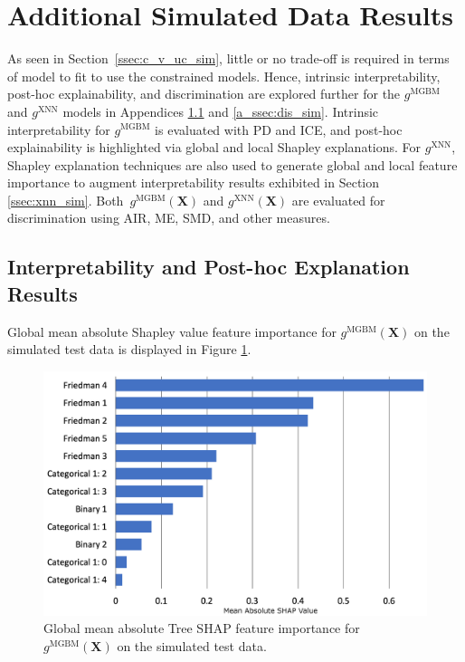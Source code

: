 \documentclass[information,article,accept,moreauthors,pdftex]{Definitions/mdpi}
\begin{document}
\section{Additional Simulated Data Results}\label{a_sec:res_sim}

As seen in Section~\ref{ssec:c_v_uc_sim}, little or no trade-off is required in terms of model to fit to use the constrained models. Hence, intrinsic interpretability, post-hoc explainability, and discrimination are explored further for the $g^\text{MGBM}$ and $g^\text{XNN}$ models in Appendices \ref{a_ssec:int_ex_sim}  and  \ref{a_ssec:dis_sim}. Intrinsic interpretability for $g^\text{MGBM}$ is evaluated with PD and ICE, and post-hoc explainability is highlighted via global and local Shapley explanations. For $g^\text{XNN}$, Shapley explanation techniques are also used to generate global and local feature importance to augment interpretability results exhibited in Section \ref{ssec:xnn_sim}. Both~$g^\text{MGBM}(\mathbf{X})$ and $g^\text{XNN}(\mathbf{X})$ are evaluated for discrimination using AIR, ME, SMD, and other measures.

\subsection{Interpretability and Post-hoc Explanation Results}\label{a_ssec:int_ex_sim}

Global mean absolute Shapley value feature importance for $g^{\text{MGBM}}(\mathbf{X})$ on the simulated test data is displayed in Figure \ref{fig:sim_mgbm_glob}. 

\begin{figure}[H]
\centering
	\captionsetup{width=16cm}
	\centering
	\includegraphics[width=12cm]{img/sim_mgbm_glob.png}
	\caption{Global mean absolute Tree SHAP feature importance for $g^\text{MGBM}(\mathbf{X})$ on the simulated test data.}
	\label{fig:sim_mgbm_glob}
\end{figure}  
\end{document}

